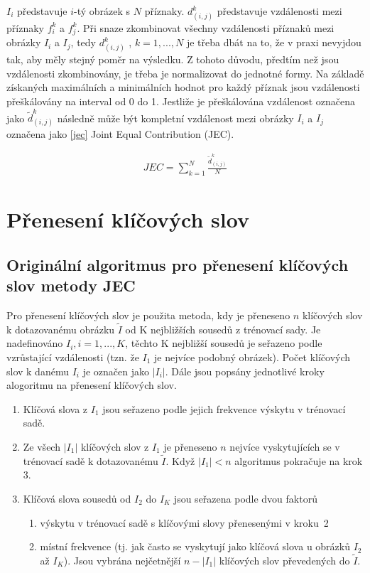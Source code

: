 \documentclass[czech,BP]{thesiskiv}
\begin{document}
\par $I_i$ představuje $i$-tý obrázek s $N$ příznaky. $d_{(i,j)}^k$ představuje vzdálenosti mezi příznaky $f_i^k$ a $f_j^k$. Při snaze zkombinovat všechny vzdálenosti příznaků mezi obrázky $I_i$ a $I_j$, tedy $d_{(i,j)}^k$ , $k=1, ..., N$  je třeba dbát na to, že v praxi nevyjdou tak, aby měly stejný poměr na výsledku. Z tohoto důvodu, předtím než jsou vzdálenosti zkombinovány, je třeba je normalizovat do jednotné formy. Na základě získaných maximálních a minimálních hodnot pro každý příznak jsou vzdálenosti přeškálovány na interval od 0 do 1. Jestliže je přeškálována vzdálenost označena jako ${\tilde{d}_{(i,j)}^k}$ následně může být kompletní vzdálenost mezi obrázky $I_i$ a $I_j$ označena jako \eqref{jec} Joint Equal Contribution (JEC).  

\begin{align}
   \label{jec} JEC = \sum_{k=1}^N\frac{\tilde{d}_{(i,j)}^k}{N}
\end{align}

\section{Přenesení klíčových slov}
\subsection{Originální algoritmus pro přenesení klíčových slov metody JEC}
\par Pro přenesení klíčových slov je použita metoda, kdy je přeneseno $n$ klíčových slov k dotazovanému obrázku $\tilde{I}$ od K nejbližších sousedů z trénovací sady. Je nadefinováno $I_{i}, i = 1, ..., K$, těchto K nejbližší sousedů je seřazeno podle vzrůstající vzdálenosti (tzn. že $I_{1} $ je nejvíce podobný obrázek). Počet klíčových slov k danému $I_{i}$ je označen jako $|I_{i}|$. Dále jsou popsány jednotlivé kroky alogoritmu na přenesení klíčových slov.
\begin{enumerate}
	\item Klíčová slova z $I_{1}$ jsou seřazeno podle jejich frekvence výskytu v trénovací sadě.
	\item Ze všech $|I_{1}|$ klíčových slov z $I_{1}$ je přeneseno $n$ nejvíce vyskytujících se v trénovací sadě k dotazovanému $\tilde{I}$. Když $|I_{1}| < n$ algoritmus pokračuje na krok 3. 
	\item Klíčová slova sousedů od $I_{2}$ do $I_{K}$ jsou seřazena podle dvou faktorů
	\begin{enumerate}
		\item výskytu v trénovací sadě s klíčovými slovy přenesenými v kroku~2
		\item místní frekvence (tj. jak často se vyskytují jako klíčová slova u obrázků $I_{2}$ až $I_{K}$). Jsou vybrána nejčetnější $n-|I_{1}|$ klíčových slov převedených do $\tilde{I}$.
	\end{enumerate}
\end{enumerate}
\end{document}
